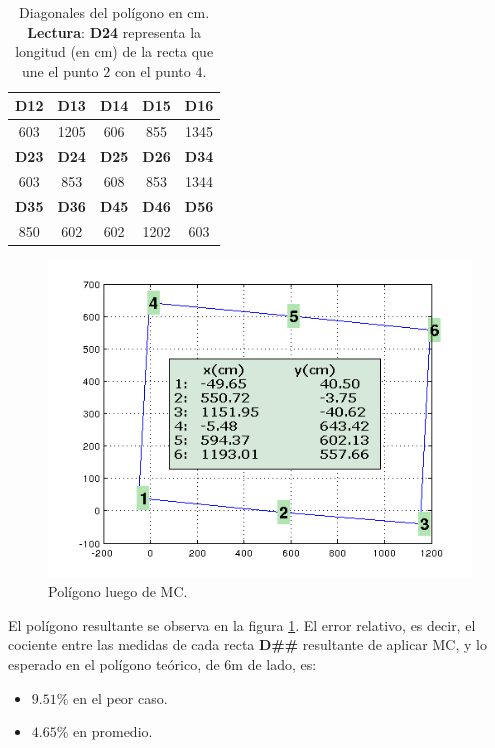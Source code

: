 \documentclass[spanish,12pt,a4paper,titlepage]{report}
\begin{document}
\begin{table}[H]
\begin{center}
\begin{tabular}{|c|c|c|c|c|}
\hline
\rowcolor[gray]{0.9}
\textbf{D12} & \textbf{D13} & \textbf{D14} & \textbf{D15} & \textbf{D16} \\
\hline
603 & 1205 & 606 & 855 & 1345 \\
\hline
\rowcolor[gray]{0.9}
\textbf{D23} & \textbf{D24} & \textbf{D25} & \textbf{D26} & \textbf{D34} \\
\hline
603 & 853 & 608 & 853 & 1344\\
\hline
\rowcolor[gray]{0.9}
\textbf{D35} & \textbf{D36} & \textbf{D45} & \textbf{D46} & \textbf{D56} \\
\hline
850 & 602 & 602 & 1202 & 603 \\
\hline
\end{tabular}
\caption{Diagonales del polígono en cm.\\\textbf{Lectura}: \textbf{D24} representa la longitud (en cm) de la recta que une el punto $2$ con el punto $4$.}
\label{tab:diagonales-poligono}
\end{center}
\end{table}

\begin{figure}
  \begin{center}
    \includegraphics[width=.5\textwidth]{./img/pol_mc.png}
  \end{center}
  \caption{Polígono luego de MC.}
\label{fig:pol_mc.png}
\end{figure}

El polígono resultante se observa en la figura \ref{fig:pol_mc.png}. El error relativo, es decir, el cociente entre las medidas de cada recta \textbf{D\#\#} resultante de aplicar MC, y lo esperado en el polígono teórico, de 6m de lado, es:

\begin{itemize}
\item $9.51\%$ en el peor caso.
\item $4.65\%$ en promedio.
\end{itemize}
\end{document}
